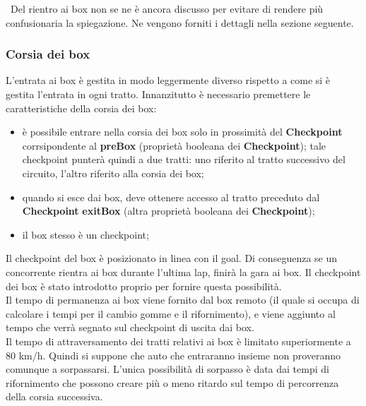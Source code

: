 \
Del rientro ai box non se ne \`{e} ancora discusso per evitare di rendere
pi\`{u} confusionaria la spiegazione. Ne vengono forniti i dettagli nella sezione seguente.
\subsubsection{Corsia dei box}
L'entrata ai box è gestita in modo leggermente diverso rispetto a come si è gestita l'entrata in ogni tratto.
Innanzitutto è necessario premettere le caratteristiche della corsia dei box:
\begin{itemize}
\item è possibile entrare nella corsia dei box solo in prossimità del \textbf{Checkpoint} corrsipondente al \textbf{preBox} (proprietà booleana
dei \textbf{Checkpoint}); tale checkpoint punterà quindi a due tratti: uno riferito al tratto successivo del circuito, l'altro riferito
alla corsia dei box;
\item quando si esce dai box, deve ottenere accesso al tratto preceduto dal \textbf{Checkpoint} \textbf{exitBox} (altra proprietà booleana
dei \textbf{Checkpoint});
\item il box stesso è un checkpoint;
\end{itemize}
Il checkpoint del box è posizionato in linea con il goal. Di conseguenza se un concorrente rientra ai 
box durante l'ultima lap, finirà la gara ai box. Il checkpoint dei box è stato introdotto proprio per
fornire questa possibilità.\\
Il tempo di permanenza ai box viene fornito dal box remoto (il quale si occupa di calcolare
i tempi per il cambio gomme e il rifornimento), e viene aggiunto al tempo che verrà segnato sul checkpoint
di uscita dai box.\\
Il tempo di attraversamento dei tratti relativi ai box è limitato superiormente a 80 km/h. Quindi si suppone
che auto che entraranno insieme non proveranno comunque a sorpassarsi. L'unica possibilità di sorpasso è data
dai tempi di rifornimento che possono creare più o meno ritardo sul tempo di percorrenza della corsia successiva.\\
